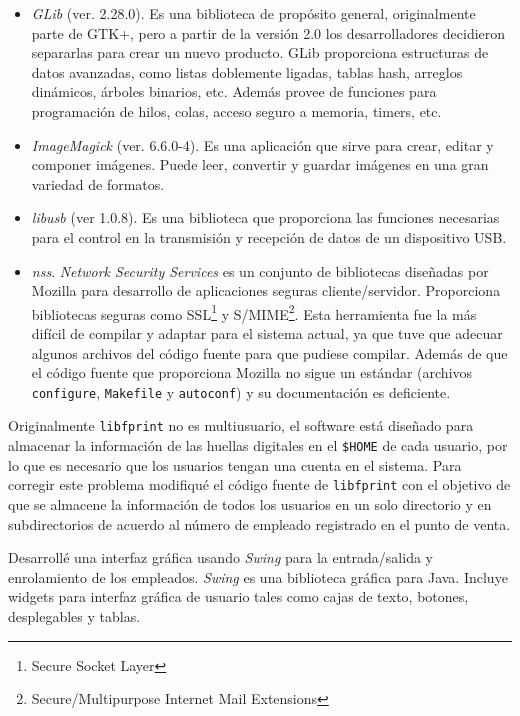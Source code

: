 \begin{itemize}
 \item \textit{GLib} (ver. 2.28.0). Es una biblioteca de propósito general, originalmente parte de GTK+, pero a partir de la versión 2.0 los desarrolladores decidieron separarlas para crear un nuevo producto. GLib proporciona estructuras de datos avanzadas, como listas doblemente ligadas, tablas hash, arreglos dinámicos, árboles binarios, etc. Además provee de funciones para programación de hilos, colas, acceso seguro a memoria, timers, etc.
 \item \textit{ImageMagick} (ver. 6.6.0-4). Es una aplicación que sirve para crear, editar y componer imágenes. Puede leer, convertir y guardar imágenes en una gran variedad de formatos.
 \item \textit{libusb} (ver 1.0.8). Es una biblioteca que proporciona las funciones necesarias para el control en la transmisión y recepción de datos de un dispositivo USB.
 \item \textit{nss}. \textit{Network Security Services} es un conjunto de bibliotecas diseñadas por Mozilla para desarrollo de aplicaciones seguras cliente/servidor. Proporciona bibliotecas seguras como SSL\footnote{Secure Socket Layer} y S/MIME\footnote{Secure/Multipurpose Internet Mail Extensions}. Esta herramienta fue la más difícil de compilar y adaptar para el sistema actual, ya que tuve que adecuar algunos archivos del código fuente para que pudiese compilar. Además de que el código fuente que proporciona Mozilla no sigue un estándar (archivos \texttt{configure}, \texttt{Makefile} y \texttt{autoconf}) y su documentación es deficiente.
\end{itemize} 

Originalmente \texttt{libfprint} no es multiusuario, el software está diseñado para almacenar la información de las huellas digitales en el \texttt{\$HOME} de cada usuario, por lo que es necesario que los usuarios tengan una cuenta en el sistema. Para corregir este problema modifiqué el código fuente de \texttt{libfprint} con el objetivo de que se almacene la información de todos los usuarios en un solo directorio y en subdirectorios de acuerdo al número de empleado registrado en el punto de venta.

Desarrollé una interfaz gráfica usando \textit{Swing} para la entrada/salida y enrolamiento de los empleados. \textit{Swing} es una biblioteca gráfica para Java. Incluye widgets para interfaz gráfica de usuario tales como cajas de texto, botones, desplegables y tablas.

